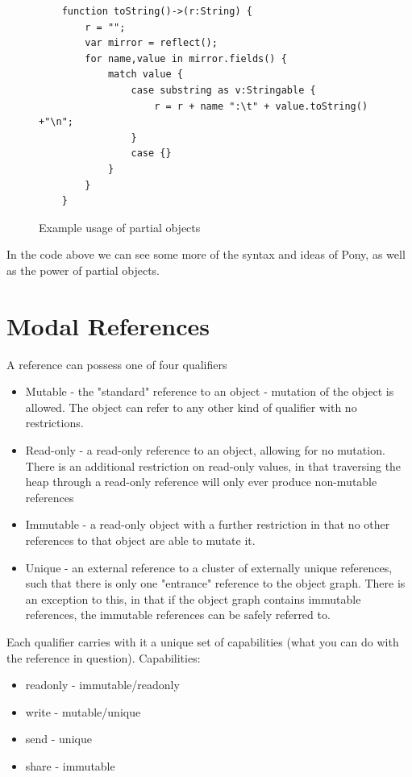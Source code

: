 \documentclass[11pt,a4paper]{report}
\begin{document}
\begin{figure}[H]
\begin{verbatim}
    function toString()->(r:String) {
        r = "";
        var mirror = reflect();
        for name,value in mirror.fields() {
            match value {
                case substring as v:Stringable {
                    r = r + name ":\t" + value.toString() +"\n";
                }
                case {}
            }
        }
    }
\end{verbatim}
\caption{Example usage of partial objects}
\label{fig:partialobj}
\end{figure}

In the code above we can see some more of the syntax and ideas of Pony, as well as the power of partial objects.

\section{Modal References}
\label{sec:immutability}

A reference can possess one of four qualifiers\cite{microsoft2012}

\begin{itemize}
	\item Mutable - the "standard" reference to an object - mutation of the object is allowed.
		The object can refer to any other kind of qualifier with no restrictions.
	\item Read-only - a read-only reference to an object, allowing for no mutation.
		There is an additional restriction on read-only values, in that traversing the heap through a read-only reference will only ever produce non-mutable references
	\item Immutable - a read-only object with a further restriction in that no other references to that object are able to mutate it.
	\item Unique - an external reference to a cluster of externally unique references, such that there is only one "entrance" reference to the object graph.
		There is an exception to this, in that if the object graph contains immutable references, the immutable references can be safely referred to.
\end{itemize}

Each qualifier carries with it a unique set of capabilities (what you can do with the reference in question).
Capabilities:
\begin{itemize}[noitemsep]
	\item readonly - immutable/readonly
	\item write - mutable/unique
	\item send - unique
	\item share - immutable
\end{itemize}
\end{document}
